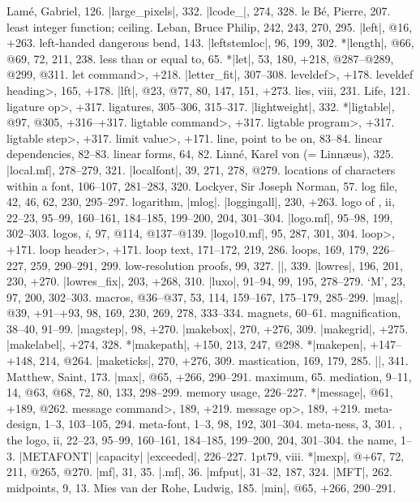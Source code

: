 Lam\'e, Gabriel, 126.
|large_pixels|, 332.
|lcode_|, 274, 328.
le B\'e, Pierre, 207.
least integer function; \see ceiling.
Leban, Bruce Philip, 242, 243, 270, 295.
|left|, @16, +263.
left-handed dangerous bend, 143.
|leftstemloc|, 96, 199, 302.
*|length|, @66, @69, 72, 211, 238.
less than or equal to, 65.
*|let|, 53, 180, +218, @287--@289, @299, @311.
\<let command>, +218.
|letter_fit|, 307--308.
\<leveldef>, +178.
\<leveldef heading>, 165, +178.
|lft|, @23, @77, 80, 147, 151, +273.
lies, viii, 231.
Life, 121.
\<ligature op>, +317.
ligatures, 305--306, 315--317.
|lightweight|, 332.
*|ligtable|, @97, @305, +316--+317.
\<ligtable command>, +317.
\<ligtable program>, +317.
\<ligtable step>, +317.
\<limit value>, +171.
line, point to be on, 83--84.
linear dependencies, 82--83.
linear forms, 64, 82.
Linn\'e, Karel von (= Linn\ae us), 325.
|local.mf|, 278--279, 321.
|localfont|, 39, 271, 278, @279.
locations of characters within a font, 106--107, 281--283, 320.
Lockyer, Sir Joseph Norman, 57.
log file, 42, 46, 62, 230, 295--297.
logarithm, \see |mlog|.
|loggingall|, 230, +263.
logo of \MF, ii, 22--23, 95--99, 160--161, 184--185, 199--200, 204, 301--304.
|logo.mf|, 95--98, 199, 302--303.
logos, {\it i},  97, @114, @137--@139.
|logo10.mf|, 95, 287, 301, 304.
\<loop>, +171.
\<loop header>, +171.
loop text, 171--172, 219, 286.
loops, 169, 179, 226--227, 259, 290--291, 299.
low-resolution proofs, 99, 327.
|\lowers|, 339.
|lowres|, 196, 201, 230, +270.
|lowres_fix|, 203, +268, 310.
|luxo|, 91--94, 99, 195, 278--279.
\newletter
`M', 23, 97, 200, 302--303.
macros, @36--@37, 53, 114, 159--167, 175--179, 285--299.
|mag|, @39, +91--+93, 98, 169, 230, 269, 278, 333--334.
magnets, 60--61.
magnification, 38--40, 91--99.
|magstep|, 98, +270.
|makebox|, 270, +276, 309.
|makegrid|, +275.
|makelabel|, +274, 328.
*|makepath|, +150, 213, 247, @298.
*|makepen|, +147--+148, 214, @264.
|maketicks|, 270, +276, 309.
mastication, 169, 179, 285.
|\math|, 341.
Matthew, Saint, 173.
|max|, @65, +266, 290--291.
maximum, 65.
mediation, 9--11, 14, @63, @68, 72, 80, 133, 298--299.
memory usage, 226--227.
*|message|, @61, +189, @262.
\<message command>, 189, +219.
\<message op>, 189, +219.
meta-design, 1--3, 103--105, 294.
meta-font, 1--3, 98, 192, 301--304.
meta-ness, 3, 301.
\MF, the logo, ii, 22--23, 95--99, 160--161, 184--185, 199--200,
 204, 301--304.
\sub the name, 1--3.
|METAFONT| |capacity| |exceeded|, 226--227.
\MF\kern1pt79, viii.
*|mexp|, @+67, 72, 211, @265, @270.
|mf|, 31, 35.
|.mf|, 36.
|mfput|, 31--32, 187, 324.
|MFT|, 262.
midpoints, 9, 13.
Mies van der Rohe, Ludwig, 185.
|min|, @65, +266, 290--291.
